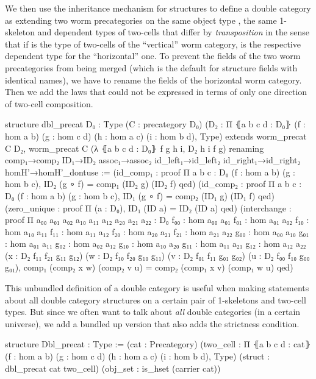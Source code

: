 We then use the inheritance mechanism for structures to define a double category
as extending two worm precategories on the same object type , the same 1-skeleton
 and dependent types of two-cells that differ by \emph{transposition}
in the sense that if  is the type of two-cells of the ``vertical''
worm category,  is the respective
dependent type for the ``horizontal'' one.
To prevent the fields of the two worm precategories from being merged (which is
the default for structure fields with identical names), we have to rename
the fields of the horizontal worm category.
Then we add the laws that could not be expressed in terms of only one direction
of two-cell composition.
\begin{leancode}
structure dbl_precat {D₀ : Type} (C : precategory D₀)
  (D₂ : Π ⦃a b c d : D₀⦄ (f : hom a b) (g : hom c d) (h : hom a c) (i : hom b d),
    Type)
  extends worm_precat C D₂,
    worm_precat C (λ ⦃a b c d : D₀⦄ f g h i, D₂ h i f g)
  renaming comp₁→comp₂ ID₁→ID₂ assoc₁→assoc₂
    id_left₁→id_left₂ id_right₁→id_right₂ homH'→homH'_dontuse :=
  (id_comp₁ : proof Π {a b c : D₀} (f : hom a b) (g : hom b c),
    ID₂ (g ∘ f) = comp₁ (ID₂ g) (ID₂ f) qed)
  (id_comp₂ : proof Π {a b c : D₀} (f : hom a b) (g : hom b c),
    ID₁ (g ∘ f) = comp₂ (ID₁ g) (ID₁ f) qed)
  (zero_unique : proof Π (a : D₀), ID₁ (ID a) = ID₂ (ID a) qed)
  (interchange : proof Π {a₀₀ a₀₁ a₀₂ a₁₀ a₁₁ a₁₂ a₂₀ a₂₁ a₂₂ : D₀}
    {f₀₀ : hom a₀₀ a₀₁} {f₀₁ : hom a₀₁ a₀₂} {f₁₀ : hom a₁₀ a₁₁}
    {f₁₁ : hom a₁₁ a₁₂} {f₂₀ : hom a₂₀ a₂₁} {f₂₁ : hom a₂₁ a₂₂}
    {g₀₀ : hom a₀₀ a₁₀} {g₀₁ : hom a₀₁ a₁₁} {g₀₂ : hom a₀₂ a₁₂}
    {g₁₀ : hom a₁₀ a₂₀} {g₁₁ : hom a₁₁ a₂₁} {g₁₂ : hom a₁₂ a₂₂}
    (x : D₂ f₁₁ f₂₁ g₁₁ g₁₂) (w : D₂ f₁₀ f₂₀ g₁₀ g₁₁)
    (v : D₂ f₀₁ f₁₁ g₀₁ g₀₂) (u : D₂ f₀₀ f₁₀ g₀₀ g₀₁),
    comp₁ (comp₂ x w) (comp₂ v u) = comp₂ (comp₁ x v) (comp₁ w u) qed)
\end{leancode}

This unbundled definition of a double category is useful when making statements about
all double category structures on a certain pair of 1-skeletons and two-cell types.
But since we often want to talk about \emph{all} double categories (in a certain
universe), we add a bundled
up version that also adds the strictness condition. %
\begin{leancode}
structure Dbl_precat : Type :=
  (cat : Precategory)
  (two_cell : Π ⦃a b c d : cat⦄ (f : hom a b)
    (g : hom c d) (h : hom a c) (i : hom b d), Type)
  (struct : dbl_precat cat two_cell)
  (obj_set : is_hset (carrier cat))
\end{leancode}

